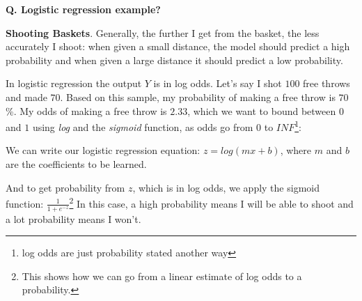 \begin{frame}[fragile]{\textbf{Q. Logistic regression example?}}
  \begin{wideitemize}
  \item \textbf{Shooting Baskets}. Generally, the further I get from the basket,
  the less accurately I shoot: when given a small distance, the model should predict
  a high probability and when given a large distance it should predict a low probability.
  \begin{wideitemize}\vspace{2mm}\small
    \item In logistic regression the output $Y$ is in log odds. Let's say I shot
    $100$ free throws and made $70$. Based on this sample, my probability of making
    a free throw is $70$\%. My odds of making a free throw is $2.33$, which we
    want to bound between $0$ and $1$ using \textit{log} and the \textit{sigmoid} function,
    as odds go from $0$ to $INF$\footnote{log odds are just probability stated another way}:
    \item We can write our logistic regression equation: $z = log(mx + b)$, where
    $m$ and $b$ are the coefficients to be learned.
    \item And to get probability from $z$, which is in log odds, we apply the sigmoid
    function: $\frac{1}{1 + e^{-z}}$\footnote{This shows how we can go from a linear
    estimate of log odds to a probability.} In this case, a high probability means
    I will be able to shoot and a lot probability means I won't.
  \end{wideitemize}
  \end{wideitemize}
\end{frame}


